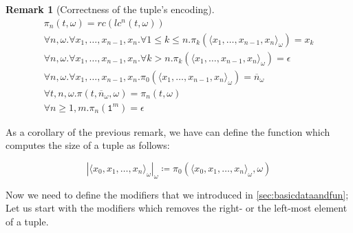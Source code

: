 \documentclass[10pt]{amsart}
\newcommand{\zero}{\mathtt{0}}
\newcommand{\one}{\mathtt{1}}
\newcommand{\vone}{x}
\newcommand{\vtwo}{y}
\newcommand{\none}{n}
\newcommand{\oone}{\omega}
\newcommand{\pred}{pd}
\newcommand{\bgs}{\in_\oone}
\newtheorem{remark}{Remark}
\begin{document}
\begin{remark}[Correctness of the tuple's encoding]
\label{rem:tupleencoding}
\[
\begin{gathered}
\pi_n(t, \oone) = rc(lc^n(t, \oone))\\
\forall n, \oone.\forall \vone_1, \ldots, \vone_{n-1}, \vone_n.\forall 1\le k \le n. \pi_k(\langle \vone_1, \ldots, \vone_{n-1}, \vone_{n}\rangle_\oone)= \vone_k\\
\forall n, \oone.\forall \vone_1, \ldots, \vone_{n-1}, \vone_n.\forall k > n. \pi_k(\langle \vone_1, \ldots, \vone_{n-1}, \vone_{n}\rangle_\oone)= \epsilon\\
\forall n, \oone.\forall \vone_1, \ldots, \vone_{n-1}, \vone_n. \pi_0(\langle \vone_1, \ldots, \vone_{n-1}, \vone_{n}\rangle_\oone)= \overline n_\oone\\
\forall t, \none, \oone. \pi(t, \overline\none_\oone, \oone)= \pi_\none(t, \oone)\\
\forall n\ge 1, m. \pi_n(\one^m)=\epsilon
\end{gathered}
\]
\end{remark}

As a corollary of the previous remark, we have can define the function which computes the size of a tuple as follows:

\[
|\langle \vone_0, \vone_1, \ldots, \vone_n\rangle_\oone|_\oone\coloneqq \pi_0(\langle \vone_0, \vone_1, \ldots, \vone_n\rangle_\oone, \oone)
\]

\begin{comment}
Tuple's belonging:

\begin{align*}
\bgs'(\vone, \epsilon, \oone) &\coloneqq \zero\\
\bgs'(\vone_1, \vone_2, \vtwo\one, \oone) &\coloneqq eq(rc(\vone_2, \oone), \vone_1, \oone)\lor_\oone \bgs'(\vone_1, lc(\vone_2, \vtwo, \oone), \vtwo, \oone)\\
\bgs'(\vone_1, \vone_2, \vtwo\zero, \oone) &\coloneqq eq(rc(\vone_2, \oone), \vone_1, \oone)\lor_\oone \bgs'(\vone_1, lc(\vone_2, \vtwo, \oone), \vtwo, \oone)\\
\bgs(el, t, \oone)&\coloneqq \bgs'(el, t, \pred(|t|_\oone), \oone)
\end{align*}
\end{comment}

Now we need to define the modifiers that we introduced in \ref{sec:basicdataandfun}; Let us start with the modifiers which removes the right- or the left-most element of a tuple.
\end{document}
